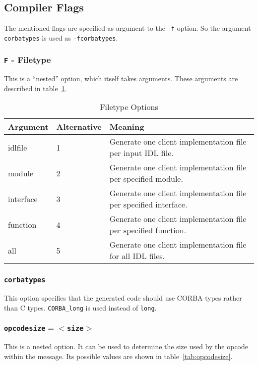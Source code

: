 \subsection{Compiler Flags}
\label{sec:comp-flags}
The mentioned flags are specified as argument to the {\tt -f} option.
So the argument {\tt corbatypes} is used as {\tt -fcorbatypes}.

\subsubsection{{\tt F} - Filetype}
This is a ``nested'' option, which itself takes arguments. These arguments
are described in table~\ref{tab:filetype}.

\begin{table}[htb]
\begin{center}
\begin{tabular}{|l|l|p{6cm}|} \hline
Argument & Alternative & Meaning \\ \hline \hline
idlfile & 1 & Generate one client implementation file per input IDL file. \\ \hline
module & 2 & Generate one client implementation file per specified module. \\ \hline
interface & 3 & Generate one client implementation file per specified interface. \\ \hline
function & 4 & Generate one client implementation file per specified function. \\ \hline
all & 5 & Generate one client implementation file for all IDL files. \\ \hline
\end{tabular}
\caption{\label{tab:filetype} Filetype Options}
\end{center}
\end{table}

\subsubsection{{\tt corbatypes}}
This option specifies that the generated code should use CORBA types rather
than C types. \verb|CORBA_long| is used instead of \verb|long|.

\subsubsection{{\tt opcodesize$=<$size$>$}}
This is a nested option. It can be used to determine the
size used by the opcode within the message. Its possible values are shown in
table~\ref{tab:opcodesize}.

